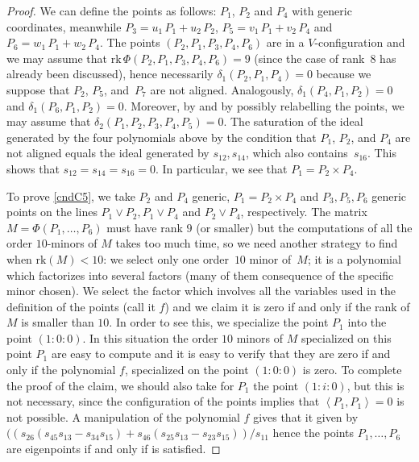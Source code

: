 \documentclass{amsart}
\theoremstyle{plain}
\theoremstyle{definition}
\newcommand{\scl}[2]{\left\langle {#1}, {#2} \right\rangle}
\newcommand{\rk}{\ensuremath{\mathrm{rk}}}
\begin{document}
\begin{proof}
We can define the points as follows: $P_1$, $P_2$ and $P_4$ with generic
coordinates, meanwhile $P_3 = u_1 \, P_1 + u_2 \, P_2$, $P_5 = v_1 \, P_1 + v_2 \, P_4$ and
$P_6 = w_1 \, P_1 + w_2 \, P_4$. The points $(P_2, P_1, P_3, P_4, P_6)$ are in a
$V$-configuration and we may assume that $\rk \, \Phi(P_2, P_1, P_3, P_4, P_6) = 9$ (since the case of rank~$8$ has already been discussed), hence necessarily $\delta_1(P_2, P_1, P_4)=0$ because we suppose that $P_2$, $P_5$, and~$P_7$ are not aligned.
Analogously, $\delta_1(P_4, P_1, P_2) = 0$ and $\delta_1(P_6, P_1, P_2) = 0$. Moreover, by  and by possibly relabelling the points, we may assume that $\delta_2(P_1, P_2, P_3, P_4, P_5)=0$. The saturation of the ideal generated by the four polynomials
above by the condition that $P_1$, $P_2$, and $P_4$ are not aligned equals the ideal generated by
$s_{12}, s_{14}$, which also contains~$s_{16}$. This shows that
$s_{12} = s_{14}=s_{16}=0$. In particular, we see that $P_1 = P_2 \times P_4$.

To prove \eqref{cndC5}, we take $P_2$ and $P_4$ generic,
$P_1 = P_2 \times P_4$ and $P_3, P_5, P_6$ generic points on the lines
$P_1 \vee P_2, P_1 \vee P_4$ and $P_2 \vee P_4$, respectively. The matrix
$M = \Phi(P_1, \dots, P_6)$ must have rank $9$ (or smaller) but the computations
of all the order $10$-minors of $M$ takes too much time, so we need another
strategy to find when $\rk (M) < 10$: we select
only one order~$10$ minor of~$M$; it is a polynomial which
factorizes into
several factors (many of them consequence of the specific minor chosen).
We select the factor which involves all the variables used in the definition
of the points (call it $f$) and we claim it is zero if and only if the
rank of $M$
is smaller than $10$. In order to see this, we specialize the point $P_1$
into the point $(1:0:0)$. In this situation the order $10$ minors of $M$
specialized on this point $P_1$ are easy to compute and it is easy to
verify that they are zero if and only if the polynomial $f$, specialized
on the point $(1:0:0)$ is zero. To complete the proof of the claim, we should
also take for $P_1$ the point $(1:i:0)$, but this is not necessary, since
the configuration of the points implies that $\scl{P_1}{P_1}=0$ is not
possible. A manipulation of the polynomial $f$ gives that it given by
$((s_{26}(s_{45}s_{13}-s_{34}s_{15})+s_{46}(s_{25}s_{13}-s_{23}s_{15}))/s_{11}$
hence the points $P_1, \dots, P_6$ are eigenpoints if and only if  is satisfied.


\end{proof}
\end{document}
